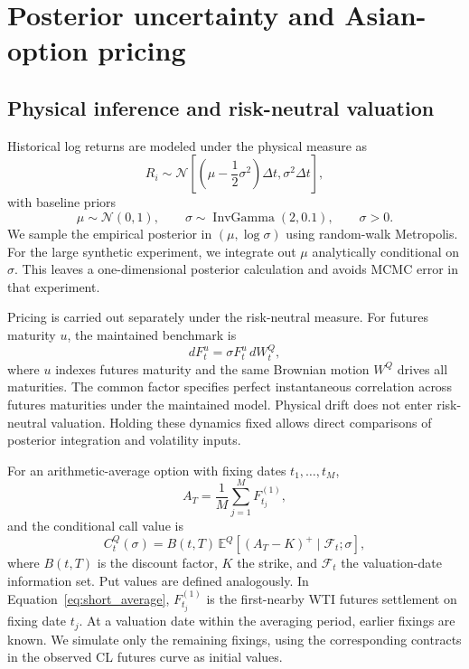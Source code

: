 \section{Posterior uncertainty and Asian-option pricing}\label{sec:short_method}

\subsection{Physical inference and risk-neutral valuation}

Historical log returns are modeled under the physical measure as
\begin{equation}
 R_i\sim
 \mathcal N\!\left[
 \left(\mu-\frac12\sigma^2\right)\Delta t,
 \sigma^2\Delta t
 \right],
 \label{eq:short_returns}
\end{equation}
with baseline priors
\begin{equation}
 \mu\sim\mathcal N(0,1),
 \qquad
 \sigma\sim\operatorname{InvGamma}(2,0.1),
 \qquad \sigma>0.
 \label{eq:short_priors}
\end{equation}
We sample the empirical posterior in \((\mu,\log\sigma)\) using random-walk Metropolis. For the large synthetic experiment, we integrate out \(\mu\) analytically conditional on \(\sigma\). This leaves a one-dimensional posterior calculation and avoids MCMC error in that experiment.

Pricing is carried out separately under the risk-neutral measure. For futures maturity \(u\), the maintained benchmark is
\begin{equation}
 dF_t^u=\sigma F_t^u\,dW_t^Q,
 \label{eq:short_q}
\end{equation}
where \(u\) indexes futures maturity and the same Brownian motion \(W^Q\) drives all maturities. The common factor specifies perfect instantaneous correlation across futures maturities under the maintained model. Physical drift does not enter risk-neutral valuation. Holding these dynamics fixed allows direct comparisons of posterior integration and volatility inputs.

For an arithmetic-average option with fixing dates \(t_1,\ldots,t_M\),
\begin{equation}
 A_T=\frac{1}{M}\sum_{j=1}^M F^{(1)}_{t_j},
 \label{eq:short_average}
\end{equation}
and the conditional call value is
\begin{equation}
 C_t^Q(\sigma)
 =
 B(t,T)\,
 \mathbb E^Q\!\left[
 (A_T-K)^+\mid\mathcal F_t;\sigma
 \right],
 \label{eq:short_call_value}
\end{equation}
where \(B(t,T)\) is the discount factor, \(K\) the strike, and \(\mathcal F_t\) the valuation-date information set. Put values are defined analogously. In Equation~\eqref{eq:short_average}, \(F^{(1)}_{t_j}\) is the first-nearby WTI futures settlement on fixing date \(t_j\). At a valuation date within the averaging period, earlier fixings are known. We simulate only the remaining fixings, using the corresponding contracts in the observed CL futures curve as initial values.

